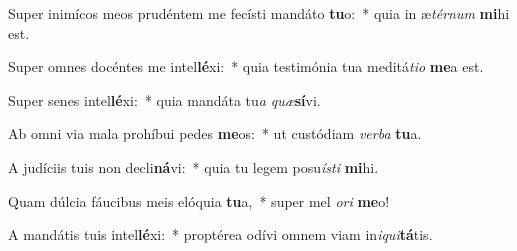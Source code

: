 \item Super inimícos meos prudéntem me fecísti mandáto \textbf{tu}o:~* quia in æ\textit{tér}\textit{num} \textbf{mi}hi est.
\item Super omnes docéntes me intel\textbf{lé}xi:~* quia testimónia tua meditá\textit{ti}\textit{o} \textbf{me}a est.
\item Super senes intel\textbf{lé}xi:~* quia mandáta tu\textit{a} \textit{quæ}\textbf{sí}vi.
\item Ab omni via mala prohíbui pedes \textbf{me}os:~* ut custódiam \textit{ver}\textit{ba} \textbf{tu}a.
\item A judíciis tuis non decli\textbf{ná}vi:~* quia tu legem posu\textit{ís}\textit{ti} \textbf{mi}hi.
\item Quam dúlcia fáucibus meis elóquia \textbf{tu}a,~* super mel \textit{o}\textit{ri} \textbf{me}o!
\item A mandátis tuis intel\textbf{lé}xi:~* proptérea odívi omnem viam in\textit{i}\textit{qui}\textbf{tá}tis.
